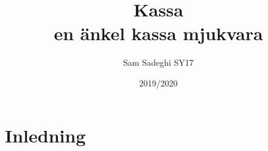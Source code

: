\documentclass[a4paper, 12pt]{article}
\title{Kassa\\\large en änkel kassa mjukvara}
\author{Sam Sadeghi SY17}
\date{2019/2020}
\begin{document}
\begin{titlepage}
\maketitle
\end{titlepage}
\tableofcontents
\newpage

\section{Inledning}

\newpage 

\printbibliography
\end{document}
